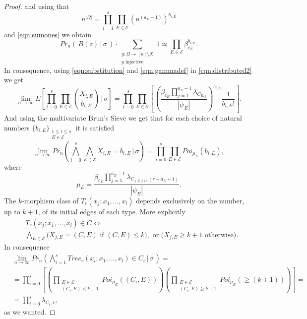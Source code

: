 \documentclass[11pt,notitlepage]{report}
\theoremstyle{definition}
\theoremstyle{remark}
\newcommand{\Ln}{\lim\limits_{n\to \infty}}
\begin{document}
\begin{proof}
 	and using that
 	\[  n^{|\Omega|}= \prod_{i=1}^{s} 
 	\prod_{E\in \mathcal{E}} (n^{(a_E-1)})^{b_{i,E}}  \]
 	and \cref{eqn:sumones} we obtain 
 	\begin{equation} \label{eqn:substitution}
 	Pr_n(\, B(z) \, | \, \sigma \, )\cdot \sum_{\substack{y:
 	\Omega \rightarrow [n]\setminus X\\ y \text{ injective}}} 1 \simeq 	
 	\prod_{E\in \mathcal{E}} \beta_{c_E}^{b_{i,E}}. 
 	\end{equation}
 	In consequence, using \cref{eqn:substitution} and \cref{eqn:gammadef} in
 	\cref{eqn:distributed2} we get
 	\[ \Ln E\left[\prod_{i=0}^{s}\prod_{E\in \mathcal{E}}
 	\binom{X_{i,E}}{b_{i,E}} \, \Bigg| \, \sigma \right]= \prod_{i=0}^{s}\prod_{E\in \mathcal{E}}
 	\left[ 	\left(\frac{\beta_{c_E} \prod_{j=1}^{a_E -1} \lambda_{C_{E,j}} }{|\psi_E|}\right)^{b_{i,E}} \frac{1}{b_{i,E}!} \right]. \]
 	And using the multivariate Brun's Sieve we get that for each
 	choice of natural numbers $\{b_{i,E}\}_{\substack{1\leq i \leq s\\ 
 	E\in \mathcal{E}}}$ it is satisfied
 	\[ \Ln Pr_n\left(\bigwedge_{i=0}^{s}\bigwedge_{E\in \mathcal{E}} X_{i,E}=b_{i,E} \, \Bigg| \, \sigma \right) = 
 	\prod_{i=0}^{s}\prod_{E\in \mathcal{E}} Poi_{\mu_E}(b_{i,E}),\]
 	where
 	\[\mu_E=
 	\frac{\beta_{c_E} \prod_{j=1}^{a_E -1} \lambda_{C_{(E,j)},(r-a_E+1)} }{|\psi_E|}.\]
 	The $k$-morphism class of $T_r(x_j;x_1, \dots, x_l)$ depends exclusively
 	on the number, up to $k+1$, of its initial edges of each type.
 	More explicitly
 	\begin{align*}
 	&T_r(x_j;x_1, \dots, x_l)\in C \iff \\
 	& \bigwedge_{E\in \mathcal{E}}
 	\big(X_{j, E}= (C,E) \text{  if  } (C,E)\leq k \big),
 	\text{  or  }  \big(X_{j, E}\geq k+1 \text{ otherwise}\big). 
 	\end{align*}
 	In consequence 
 	\begin{align*}
 	&\Ln Pr_n(\bigwedge_{i=1}^s Tree_r(x_i; x_1, \dots, x_l)\in C_i \, | 
 	\, \sigma \,)=\\ 
 	&=\prod_{i=0}^{s}\left[
 	\left(\prod_{\substack{E\in \mathcal{E}\\ (C_i,E)<k+1}} Poi_{\mu_E}((C_i,E))\right)
 	\left(\prod_{\substack{E\in \mathcal{E}\\ (C_i,E)\geq k+1}} 
 	Poi_{\mu_E}(\geq (k+1))\right)\right]=\\
 	&=\prod_{i=0}^{s} \lambda_{C_i,r},
    \end{align*}
 	as we wanted. 
 	 	

\end{proof}
\end{document}
